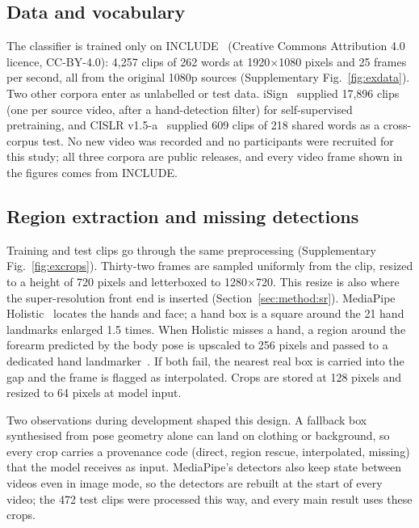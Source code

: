 \documentclass[pdflatex,sn-mathphys-num,twocolumn,lineno]{sn-jnl}
\theoremstyle{thmstyleone}%
\begin{document}
\subsection{Data and vocabulary}\label{sec:method:data}
The classifier is trained only on INCLUDE~\cite{sridhar2020include} (Creative Commons Attribution 4.0 licence, CC-BY-4.0): 4,257 clips of 262 words at 1920$\times$1080 pixels and 25 frames per second, all from the original 1080p sources (Supplementary Fig.~\ref{fig:exdata}). Two other corpora enter as unlabelled or test data. iSign~\cite{joshi2024isign} supplied 17,896 clips (one per source video, after a hand-detection filter) for self-supervised pretraining, and CISLR v1.5-a~\cite{joshi2022cislr} supplied 609 clips of 218 shared words as a cross-corpus test. No new video was recorded and no participants were recruited for this study; all three corpora are public releases, and every video frame shown in the figures comes from INCLUDE.

\subsection{Region extraction and missing detections}\label{sec:method:pre}
Training and test clips go through the same preprocessing (Supplementary Fig.~\ref{fig:excrops}). Thirty-two frames are sampled uniformly from the clip, resized to a height of 720 pixels and letterboxed to 1280$\times$720. This resize is also where the super-resolution front end is inserted (Section~\ref{sec:method:sr}). MediaPipe Holistic~\cite{lugaresi2019mediapipe} locates the hands and face; a hand box is a square around the 21 hand landmarks enlarged 1.5 times. When Holistic misses a hand, a region around the forearm predicted by the body pose is upscaled to 256 pixels and passed to a dedicated hand landmarker~\cite{zhang2020mphands}. If both fail, the nearest real box is carried into the gap and the frame is flagged as interpolated. Crops are stored at 128 pixels and resized to 64 pixels at model input.

Two observations during development shaped this design. A fallback box synthesised from pose geometry alone can land on clothing or background, so every crop carries a provenance code (direct, region rescue, interpolated, missing) that the model receives as input. MediaPipe's detectors also keep state between videos even in image mode, so the detectors are rebuilt at the start of every video; the 472 test clips were processed this way, and every main result uses these crops.
\end{document}
